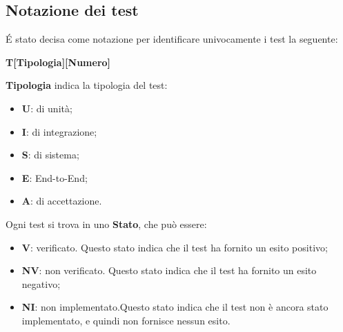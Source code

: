 \subsection{Notazione dei test}
\'E stato decisa come notazione per identificare univocamente i test la seguente:
\begin{center}
    \textbf{T[Tipologia][Numero]}
\end{center}
\textbf{Tipologia} indica la tipologia del test:
\begin{itemize}
    \item \textbf{U}: di unità;
    \item \textbf{I}: di integrazione;
    \item \textbf{S}: di sistema;
    \item \textbf{E}: End-to-End;
    \item \textbf{A}: di accettazione.
\end{itemize}
Ogni test si trova in uno \textbf{Stato}, che può essere:
\begin{itemize}
    \item \textbf{V}: verificato. Questo stato indica che il test ha fornito un esito positivo;
    \item \textbf{NV}: non verificato. Questo stato indica che il test ha fornito un esito negativo;
    \item \textbf{NI}: non implementato.Questo stato indica che il test non è ancora stato implementato, e quindi non fornisce nessun esito.
\end{itemize}

